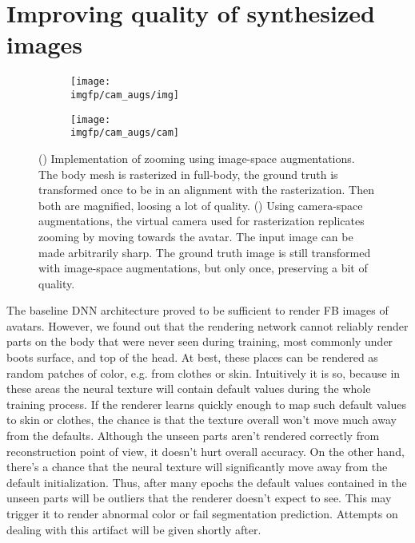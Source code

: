 \section{Improving quality of synthesized images}\label{methods:zooms}
\begin{figure}
	\centering
	\begin{subfigure}[b]{0.48\textwidth}
		\centering
		\texttt{[image: \\imgfp/cam\_augs/img]}%
		\caption{}
		\label{fig:cam_aug:before}
	\end{subfigure}
	\begin{subfigure}[b]{0.48\textwidth}
		\centering
		\texttt{[image: \\imgfp/cam\_augs/cam]}%
		\caption{}
		\label{fig:cam_aug:after}
	\end{subfigure}
	\caption{(\protect{}) Implementation of zooming using image-space augmentations. The body mesh is rasterized in full-body, the ground truth is transformed once to be in an alignment with the rasterization. Then both are magnified, loosing a lot of quality. (\protect{}) Using camera-space augmentations, the virtual camera used for rasterization replicates zooming by moving towards the avatar. The input image can be made arbitrarily sharp. The ground truth image is still transformed with image-space augmentations, but only once, preserving a bit of quality. }
	\label{fig:cam_aug}
\end{figure}

The baseline DNN architecture \cite{dnn:stylepeople21} proved to be sufficient to render FB images of avatars. However, we found out that the rendering network cannot reliably render parts on the body that were never seen during training, most commonly under boots surface, and top of the head. At best, these places can be rendered as random patches of color, e.g. from clothes or skin. Intuitively it is so, because in these areas the neural texture will contain default values during the whole training process. If the renderer learns quickly enough to map such default values to skin or clothes, the chance is that the texture overall won't move much away from the defaults. Although the unseen parts aren't rendered correctly from reconstruction point of view, it doesn't hurt overall accuracy. On the other hand, there's a chance that the neural texture will significantly move away from the default initialization. Thus, after many epochs the default values contained in the unseen parts will be outliers that the renderer doesn't expect to see. This may trigger it to render abnormal color or fail segmentation prediction. Attempts on dealing with this artifact will be given shortly after.

